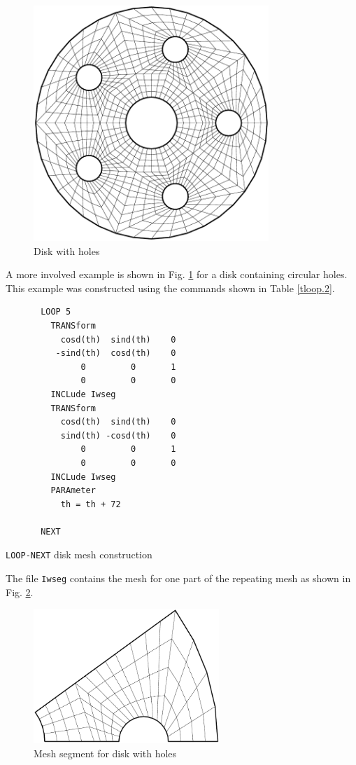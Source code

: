 \begin{figure}[ht!]
\centerline {\hfil \includegraphics[height=3.5in]{figs/wheel5} \hfil}
\caption{Disk with holes \label{floop.1}}
\end{figure}
A more involved example is shown 
in Fig. \ref{floop.1} for a disk containing circular holes.  This
example was constructed using the commands shown in Table \ref{tloop.2}.
\begin{table}[ht!]
\begin{center}
\begin{verbatim}
       LOOP 5
         TRANSform
           cosd(th)  sind(th)    0
          -sind(th)  cosd(th)    0
               0         0       1
               0         0       0
         INCLude Iwseg
         TRANSform
           cosd(th)  sind(th)    0
           sind(th) -cosd(th)    0
               0         0       1
               0         0       0
         INCLude Iwseg
         PARAmeter
           th = th + 72

       NEXT
\end{verbatim}
\caption{\texttt{LOOP-NEXT} disk mesh construction \label{tloop.2}}
\end{center}
\end{table}
The file \texttt{Iwseg} contains the mesh for one part of the repeating
mesh as shown in Fig. \ref{floop.2}.
\begin{figure}[ht!]
\centerline {\hfil \includegraphics[height=2.0in]{figs/wheelsg} \hfil}
\caption{Mesh segment for disk with holes \label{floop.2}}
\end{figure}

